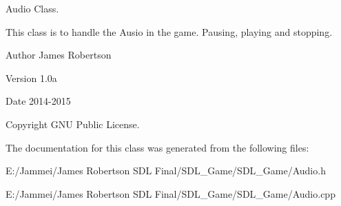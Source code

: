 Audio Class. 

This class is to handle the Ausio in the game. Pausing, playing and stopping. \begin{DoxyAuthor}{Author}
James Robertson 
\end{DoxyAuthor}
\begin{DoxyVersion}{Version}
1.\+0a 
\end{DoxyVersion}
\begin{DoxyDate}{Date}
2014-\/2015 
\end{DoxyDate}
\begin{DoxyCopyright}{Copyright}
G\+N\+U Public License. 
\end{DoxyCopyright}


The documentation for this class was generated from the following files\+:\begin{DoxyCompactItemize}
\item 
E\+:/\+Jammei/\+James Robertson S\+D\+L Final/\+S\+D\+L\+\_\+\+Game/\+S\+D\+L\+\_\+\+Game/Audio.\+h\item 
E\+:/\+Jammei/\+James Robertson S\+D\+L Final/\+S\+D\+L\+\_\+\+Game/\+S\+D\+L\+\_\+\+Game/Audio.\+cpp\end{DoxyCompactItemize}
